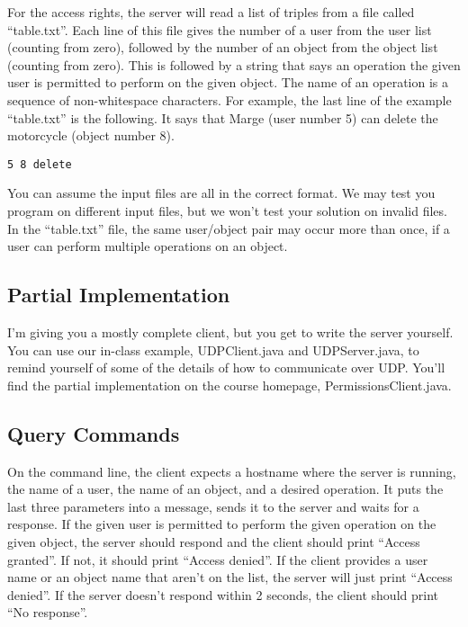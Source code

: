 \documentclass{article}
\begin{document}
\begin{enumerate}
  For the access rights, the server will read a list of triples from a
  file called ``table.txt''.  Each line of this file gives the number
  of a user from the user list (counting from zero), followed by the
  number of an object from the object list (counting from zero).  This
  is followed by a string that says an operation the given user is
  permitted to perform on the given object.  The name of an operation
  is a sequence of non-whitespace characters.  For example, the last
  line of the example ``table.txt'' is the following.  It says that
  Marge (user number 5) can delete the motorcycle (object number 8).

\begin{verbatim}
5 8 delete
\end{verbatim}

  You can assume the input files are all in the correct format.  We
  may test you program on different input files, but we won't test
  your solution on invalid files.  In the ``table.txt'' file, the same
  user/object pair may occur more than once, if a user can perform
  multiple operations on an object.

\subsection*{Partial Implementation}

  I'm giving you a mostly complete client, but you get to write the
  server yourself.  You can use our in-class example, UDPClient.java
  and UDPServer.java, to remind yourself of some of the details of how
  to communicate over UDP.  You'll find the partial implementation on
  the course homepage, PermissionsClient.java.

\subsection*{Query Commands}

  On the command line, the client expects a hostname where the server
  is running, the name of a user, the name of an object, and a desired
  operation.  It puts the last three parameters into a message, sends
  it to the server and waits for a response.  If the given user is
  permitted to perform the given operation on the given object, the
  server should respond and the client should print ``Access
  granted''.  If not, it should print ``Access denied''.  If the
  client provides a user name or an object name that aren't on the
  list, the server will just print ``Access denied''.  If the server
  doesn't respond within 2 seconds, the client should print ``No
  response''.


\end{enumerate}
\end{document}
